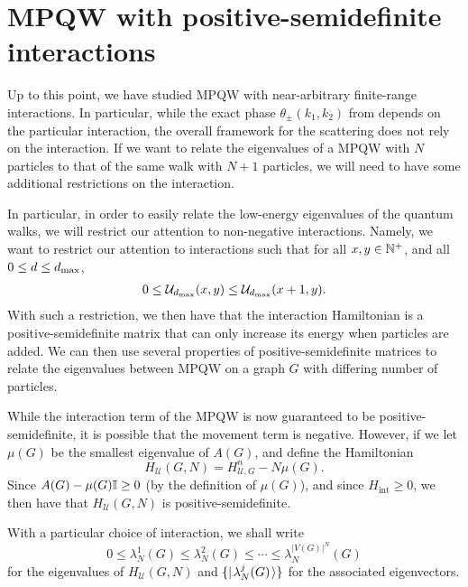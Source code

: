 \documentclass[../thesis-main/thesis-main]{subfiles}
\begin{document}
\section{MPQW with positive-semidefinite interactions}\label{sec:MPQW_pos}

Up to this point, we have studied MPQW with near-arbitrary finite-range interactions.  In particular, while the exact phase $\theta_\pm(k_1,k_2)$ from  depends on the particular interaction, the overall framework for the scattering does not rely on the interaction.  If we want to relate the eigenvalues of a MPQW with $N$ particles to that of the same walk with $N+1$ particles, we will need to have some additional restrictions on the interaction.

In particular, in order to easily relate the low-energy eigenvalues of the quantum walks, we will restrict our attention to non-negative interactions.  Namely, we want to restrict our attention to interactions such that for all $x,y \in \mathbb{N}^+$, and all $0\leq d \leq d_{\text{max}}$, 
\begin{align}
0 \leq \mathcal{U}_{d_{\text{max}}}(x,y) \leq \mathcal{U}_{d_{\text{max}}}(x+1,y).
\end{align}
With such a restriction, we then have that the interaction Hamiltonian is a positive-semidefinite matrix that can only increase its energy when particles are added.  We can then use several properties of positive-semidefinite matrices to relate the eigenvalues between MPQW on a graph $G$ with differing number of particles.

While the interaction term of the MPQW is now guaranteed to be positive-semidefinite, it is possible that the movement term is negative.  However, if we let $\mu(G)$ be the smallest eigenvalue of $A(G)$, and define the Hamiltonian
\begin{equation}
  H_{\mathcal{U}}(G,N) = H_{\mathcal{U},G}^n - N \mu(G).
\end{equation}
Since $A(G) - \mu(G) \mathbb{I}\geq 0$ (by the definition of $\mu(G)$), and since $H_{\text{int}} \geq 0$, we then have that $H_{\mathcal{U}}(G,N)$ is positive-semidefinite.

With a particular choice of interaction, we shall write
\begin{equation}
  0 \leq \lambda_N^1(G) \leq \lambda_N^2(G) \leq \cdots \leq \lambda_N^{|V(G)|^N} (G)
\end{equation}
for the eigenvalues of $H_{\mathcal{U}}(G,N)$ and $\{|\mspace{2mu} \lambda_N^j(G) \mspace{2mu} \rangle\}$ for the associated eigenvectors.
\end{document}
